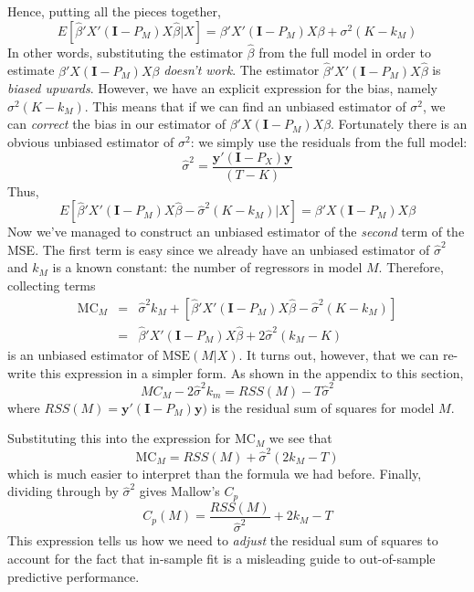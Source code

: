 Hence, putting all the pieces together,
\begin{equation*}
E\left[\widehat{\beta}'X'(\mathbf{I} - P_M)X\widehat{\beta} |X\right] = \beta'X'(\mathbf{I}- P_M)X\beta +  \sigma^2 (K - k_M) 
\end{equation*}
In other words, substituting the estimator $\widehat{\beta}$ from the full model in order to estimate $\beta'X(\mathbf{I}- P_M)X\beta$ \emph{doesn't work}. 
The estimator $\widehat{\beta}'X'(\mathbf{I} - P_M)X\widehat{\beta}$ is \emph{biased upwards}.
However, we have an explicit expression for the bias, namely $\sigma^2 (K - k_M)$.
This means that if we can find an unbiased estimator of $\sigma^2$, we can \emph{correct} the bias in our estimator of $\beta'X(\mathbf{I}- P_M)X\beta$.
Fortunately there is an obvious unbiased estimator of $\sigma^2$: we simply use the residuals from the full model:
	$$\widehat{\sigma}^2 = \frac{\mathbf{y}'(\mathbf{I} - P_X)\mathbf{y}}{(T-K)}$$
Thus, 
	$$E[\widehat{\beta}'X'(\mathbf{I} - P_M)X\widehat{\beta} - \widehat{\sigma}^2(K- k_M) |X ] = \beta'X(\mathbf{I}- P_M)X\beta$$ 
Now we've managed to construct an unbiased estimator of the \emph{second} term of the MSE.
The first term is easy since we already have an unbiased estimator of $\widehat{\sigma}^2$ and $k_M$ is a known constant: the number of regressors in model $M$.
Therefore, collecting terms
	\begin{eqnarray*}
		\mbox{MC}_M &=& \widehat{\sigma}^2 k_M + \left[\widehat{\beta}'X'(\mathbf{I} - P_M)X\widehat{\beta} - \widehat{\sigma}^2(K- k_M) \right]\\
			&=& \widehat{\beta}'X'(\mathbf{I} - P_M)X\widehat{\beta} + 2\widehat{\sigma}^2 (k_M - K)
	\end{eqnarray*}
is an unbiased estimator of $\mbox{MSE}(M|X)$. 
It turns out, however, that we can re-write this expression in a simpler form.
As shown in the appendix to this section,
$$MC_M - 2 \widehat{\sigma}^2 k_m = RSS(M) - T\widehat{\sigma}^2$$
where $RSS(M) = \mathbf{y}'(\mathbf{I} - P_M)\mathbf{y})$ is the residual sum of squares for model $M$.


Substituting this into the expression for $\mbox{MC}_M$ we see that 
	$$\mbox{MC}_M = RSS(M) + \widehat{\sigma}^2(2 k_M - T)$$
which is much easier to interpret than the formula we had before.
Finally, dividing through by $\widehat{\sigma}^2$ gives Mallow's $C_p$
	$$C_p(M) = \frac{RSS(M)}{\widehat{\sigma}^2} + 2k_M - T$$
This expression tells us how we need to \emph{adjust} the residual sum of squares to account for the fact that in-sample fit is a misleading guide to out-of-sample predictive performance.

